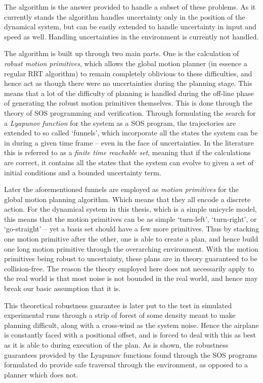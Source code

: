 The \rrtfunnel{} algorithm is the answer provided to handle a subset of these
problems. As it currently stands the algorithm handles uncertainty only in the
position of the dynamical system, but can be easily extended to handle
uncertainty in input and speed as well. Handling uncertainties in the
environment is currently not handled.

The algorithm is built up through two main parts. One is the calculation of
\textit{robust motion primitives}, which allows the global motion planner (in
essence a regular \ac{RRT} algorithm) to remain completely oblivious to these
difficulties, and hence act as though there were no uncertainties during the
planning stage. This means that a lot of the difficulty of planning is handled
during the off-line phase of generating the robust motion primitives themselves.
This is done through the theory of \ac{SOS} programming and verification.
Through formulating the search for a \textit{Lyapunov function} for the system
as a \ac{SOS} program, the trajectories are extended to so called `funnels',
which incorporate all the states the system can be in during a given time frame
-- even in the face of uncertainties. In the literature this is referred to as a
\textit{finite time reachable set}, meaning that if the calculations are
correct, it contains all the states that the system can evolve to given a set of
initial conditions and a bounded uncertainty term.

Later the aforementioned funnels are employed as \textit{motion primitives} for
the global motion planning algorithm. Which means that they all encode a
discrete action. For the dynamical system in this thesis, which is a simple
unicycle model, this means that the motion primitives can be as simple
`turn-left', `turn-right', or `go-straight' -- yet a basis set should have a few
more primitives. Thus by stacking one motion primitive after the other, one is
able to create a plan, and hence build one long motion primitive through the
overarching environment. With the motion primitives being robust to uncertainty,
these plans are in theory guaranteed to be collision-free. The reason the theory
employed here does not necessarily apply to the real world is that most noise is
not bounded in the real world, and hence may break our basic assumption that it
is.

This theoretical robustness guarantee is later put to the test in simulated
experimental runs through a strip of forest of some density meant to make
planning difficult, along with a cross-wind as the system noise. Hence the
airplane is constantly faced with a positional offset, and is forced to deal
with this as best as it is able to during execution of the plan. As is shown,
the robustness guarantees provided by the Lyapunov functions found through the
\ac{SOS} programs formulated do provide safe traversal through the environment,
as opposed to a planner which does not.



